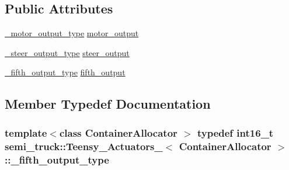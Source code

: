 \subsection*{Public Attributes}
\begin{DoxyCompactItemize}
\item 
\hyperlink{structsemi__truck_1_1_teensy___actuators___a1cefa1e8e0f45e76b2f6322407c74ab1}{\+\_\+motor\+\_\+output\+\_\+type} \hyperlink{structsemi__truck_1_1_teensy___actuators___a9157e40c9500ca6bbd20f4938dcb5a9b}{motor\+\_\+output}
\item 
\hyperlink{structsemi__truck_1_1_teensy___actuators___a38b3265a1e0521620575f2cdcec23d1a}{\+\_\+steer\+\_\+output\+\_\+type} \hyperlink{structsemi__truck_1_1_teensy___actuators___aa98f0b646061a5b36b71922a6fe0630f}{steer\+\_\+output}
\item 
\hyperlink{structsemi__truck_1_1_teensy___actuators___ac866dd52df9dc5d61aac2c073d49c91b}{\+\_\+fifth\+\_\+output\+\_\+type} \hyperlink{structsemi__truck_1_1_teensy___actuators___ab32dfbbdaec1341c59b86d39e26e4eda}{fifth\+\_\+output}
\end{DoxyCompactItemize}


\subsection{Member Typedef Documentation}
\subsubsection[{\texorpdfstring{\+\_\+fifth\+\_\+output\+\_\+type}{_fifth_output_type}}]{\setlength{\rightskip}{0pt plus 5cm}template$<$class Container\+Allocator $>$ typedef int16\+\_\+t {\bf semi\+\_\+truck\+::\+Teensy\+\_\+\+Actuators\+\_\+}$<$ Container\+Allocator $>$\+::{\bf \+\_\+fifth\+\_\+output\+\_\+type}}\hypertarget{structsemi__truck_1_1_teensy___actuators___ac866dd52df9dc5d61aac2c073d49c91b}{}\label{structsemi__truck_1_1_teensy___actuators___ac866dd52df9dc5d61aac2c073d49c91b}
